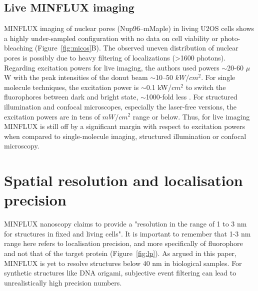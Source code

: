\documentclass[9pt,twocolumn,twoside]{pnas-new}
\begin{document}
\subsection{Live MINFLUX imaging}
MINFLUX imaging of nuclear pores (Nup96–mMaple) in living U2OS cells shows a highly under-sampled configuration with no data on cell viability or photo-bleaching (Figure~\ref{fig:micos}B). The observed uneven distribution of nuclear pores is possibly due to heavy filtering of localizations (>1600 photons).\\
Regarding excitation powers for live imaging, the authors used powers $\sim$20-60 $\mu$W with the peak intensities of the donut beam $\sim$10–50 $kW/cm^2$. For single molecule techniques, the excitation power is $\sim$0.1 kW/$cm^2$ to switch the fluorophores between dark and bright state, $\sim$1000-fold less \citep{betzig2006imaging}. For structured illumination and confocal microscopes, especially the laser-free versions, the excitation powers are in tens of $mW/cm^2$ range or below. Thus, for live imaging MINFLUX is still off by a significant margin with respect to excitation powers when compared to single-molecule imaging, structured illumination or confocal microscopy.


\section{Spatial resolution and localisation precision}

MINFLUX nanoscopy claims to provide a "resolution in the range of 1 to 3 nm for structures in fixed and living cells". It is important to remember that 1-3 nm range here refers to localisation precision, and more specifically of fluorophore and not that of the target protein (Figure~\ref{fig:lp}). As argued in this paper, MINFLUX is yet to resolve structures below 40 nm in biological samples. For synthetic structures like DNA origami, subjective event filtering can lead to unrealistically high precision numbers. 
\end{document}
